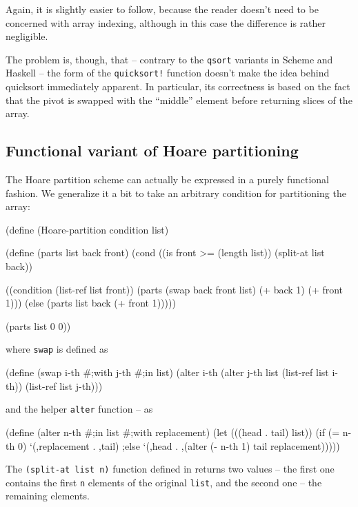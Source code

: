 Again, it is slightly easier to follow, because the reader doesn't need
to be concerned with array indexing, although in this case the difference
is rather negligible.

The problem is, though, that -- contrary to the \texttt{qsort} variants
in Scheme and Haskell -- the form of the \texttt{quicksort!}\,\,function
doesn't make the idea behind quicksort immediately apparent. In particular,
its correctness is based on the fact that the pivot is swapped with the
``middle'' element before returning slices of the array.

\subsection{Functional variant of Hoare partitioning}

The Hoare partition scheme can actually be expressed in a purely functional
fashion. We generalize it a bit to take an arbitrary condition for
partitioning the array:

\begin{Snippet}
(define (Hoare-partition condition list)
  
  (define (parts list back front)
    (cond ((is front >= (length list))
	   (split-at list back))
	
	  ((condition (list-ref list front))
           (parts (swap back front list) (+ back 1)
                                         (+ front 1)))
	  (else
	   (parts list back (+ front 1)))))
  
  (parts list 0 0))
\end{Snippet}

where \texttt{swap} is defined as

\begin{Snippet}
(define (swap i-th #;with j-th #;in list)
  (alter i-th (alter j-th list (list-ref list i-th))
	 (list-ref list j-th)))
\end{Snippet}

and the helper \texttt{alter} function -- as \label{alter}

\begin{Snippet}
(define (alter n-th #;in list #;with replacement)
  (let (((head . tail) list))
    (if (= n-th 0)
        `(,replacement . ,tail)
    ;else
        `(,head . ,(alter (- n-th 1) tail
                          replacement)))))
\end{Snippet}

The \texttt{(split-at list n)} function defined in \cite{SRFI-1} returns
two values -- the first one contains the first \texttt{n} elements of
the original \texttt{list}, and the second one -- the remaining elements.

